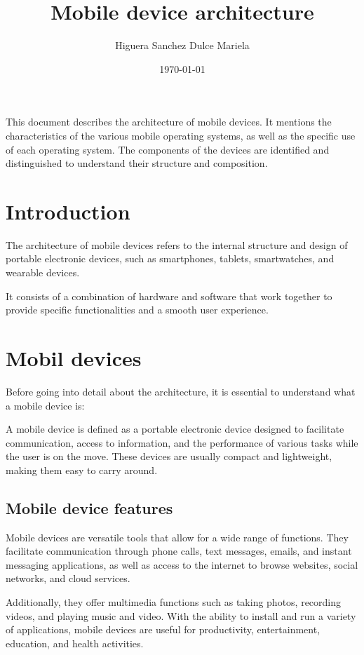 \documentclass{article}
\title{Mobile device architecture}
\author{Higuera Sanchez Dulce Mariela}
\date{\today}
\begin{document}
 
	
	\maketitle This document describes the architecture of mobile devices. It mentions the characteristics of the various mobile operating systems, as well as the specific use of each operating system. The components of the devices are identified and distinguished to understand their structure and composition.
	
	\begin{multicols}{2}
		\section{Introduction}
		The architecture of mobile devices refers to the internal structure and design of portable electronic devices, such as smartphones, tablets, smartwatches, and wearable devices. 
		
		It consists of a combination of hardware and software that work together to provide specific functionalities and a smooth user experience.
		
		\section{Mobil devices}
		Before going into detail about the architecture, it is essential to understand what a mobile device is:
		
		A mobile device is defined as a portable electronic device designed to facilitate communication, access to information, and the performance of various tasks while the user is on the move. These devices are usually compact and lightweight, making them easy to carry around.
		
		\subsection{Mobile device features}
		Mobile devices are versatile tools that allow for a wide range of functions. They facilitate communication through phone calls, text messages, emails, and instant messaging applications, as well as access to the internet to browse websites, social networks, and cloud services. 
		
		Additionally, they offer multimedia functions such as taking photos, recording videos, and playing music and video. With the ability to install and run a variety of applications, mobile devices are useful for productivity, entertainment, education, and health activities. 
		

\end{multicols}
\end{document}
